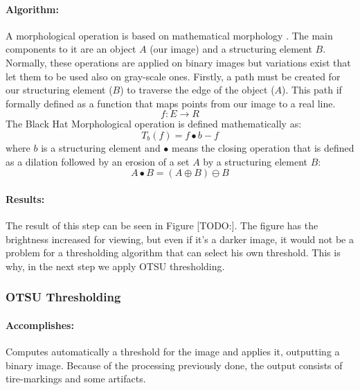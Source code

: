 \paragraph*{Algorithm:}\mbox{}\par
A morphological operation is based on mathematical morphology \cite{article:mathematical-morphology}. The main components to it are an object $A$ (our image) and a structuring element $B$. Normally, these operations are applied on binary images but variations exist that let them to be used also on gray-scale ones. Firstly, a path must be created for our structuring element ($B$) to traverse the edge of the object ($A$). This path if formally defined as a function that maps points from our image to a real line.
\[f:E \rightarrow R\]
The Black Hat Morphological operation is defined mathematically as:
\[T_b(f) = f \bullet b - f\]
where $b$ is a structuring element and $\bullet$ means the closing operation that is defined as a dilation followed by an erosion of a set $A$ by a structuring element $B$:
\[A \bullet B = (A \oplus B) \ominus B\]

\paragraph*{Results:}\mbox{}\par
The result of this step can be seen in Figure [TODO:]. The figure has the brightness increased for viewing, but even if it's a darker image, it would not be a problem for a thresholding algorithm that can select his own threshold. This is why, in the next step we apply OTSU thresholding.

\subsubsection{OTSU Thresholding}
\label{subsubsec:OTSU-binarization}

\paragraph*{Accomplishes:}\mbox{}\par
Computes automatically a threshold for the image and applies it, outputting a binary image. Because of the processing previously done, the output consists of tire-markings and some artifacts.

